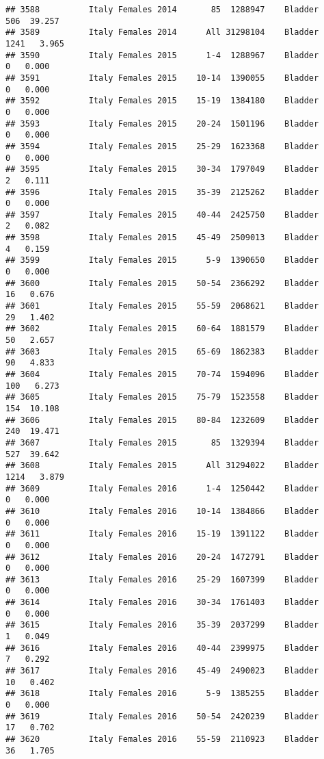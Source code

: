 \documentclass[
]{article}
\begin{document}
\begin{verbatim}
## 3588          Italy Females 2014       85  1288947    Bladder    506  39.257
## 3589          Italy Females 2014      All 31298104    Bladder   1241   3.965
## 3590          Italy Females 2015      1-4  1288967    Bladder      0   0.000
## 3591          Italy Females 2015    10-14  1390055    Bladder      0   0.000
## 3592          Italy Females 2015    15-19  1384180    Bladder      0   0.000
## 3593          Italy Females 2015    20-24  1501196    Bladder      0   0.000
## 3594          Italy Females 2015    25-29  1623368    Bladder      0   0.000
## 3595          Italy Females 2015    30-34  1797049    Bladder      2   0.111
## 3596          Italy Females 2015    35-39  2125262    Bladder      0   0.000
## 3597          Italy Females 2015    40-44  2425750    Bladder      2   0.082
## 3598          Italy Females 2015    45-49  2509013    Bladder      4   0.159
## 3599          Italy Females 2015      5-9  1390650    Bladder      0   0.000
## 3600          Italy Females 2015    50-54  2366292    Bladder     16   0.676
## 3601          Italy Females 2015    55-59  2068621    Bladder     29   1.402
## 3602          Italy Females 2015    60-64  1881579    Bladder     50   2.657
## 3603          Italy Females 2015    65-69  1862383    Bladder     90   4.833
## 3604          Italy Females 2015    70-74  1594096    Bladder    100   6.273
## 3605          Italy Females 2015    75-79  1523558    Bladder    154  10.108
## 3606          Italy Females 2015    80-84  1232609    Bladder    240  19.471
## 3607          Italy Females 2015       85  1329394    Bladder    527  39.642
## 3608          Italy Females 2015      All 31294022    Bladder   1214   3.879
## 3609          Italy Females 2016      1-4  1250442    Bladder      0   0.000
## 3610          Italy Females 2016    10-14  1384866    Bladder      0   0.000
## 3611          Italy Females 2016    15-19  1391122    Bladder      0   0.000
## 3612          Italy Females 2016    20-24  1472791    Bladder      0   0.000
## 3613          Italy Females 2016    25-29  1607399    Bladder      0   0.000
## 3614          Italy Females 2016    30-34  1761403    Bladder      0   0.000
## 3615          Italy Females 2016    35-39  2037299    Bladder      1   0.049
## 3616          Italy Females 2016    40-44  2399975    Bladder      7   0.292
## 3617          Italy Females 2016    45-49  2490023    Bladder     10   0.402
## 3618          Italy Females 2016      5-9  1385255    Bladder      0   0.000
## 3619          Italy Females 2016    50-54  2420239    Bladder     17   0.702
## 3620          Italy Females 2016    55-59  2110923    Bladder     36   1.705

\end{verbatim}
\end{document}
